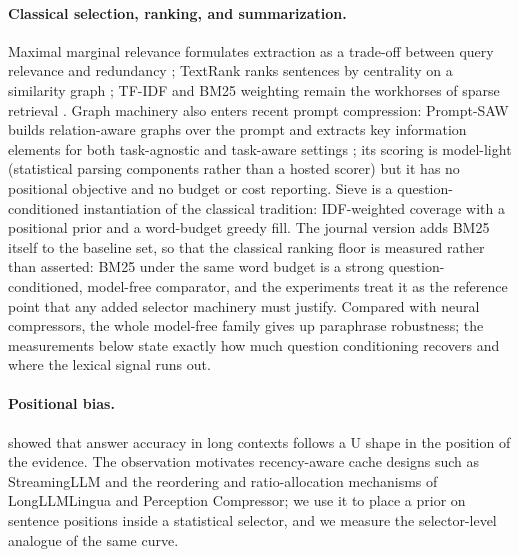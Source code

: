 \documentclass[pdflatex,sn-basic]{sn-jnl}
\theoremstyle{remark}
\newcommand{\method}{Sieve}
\begin{document}
\paragraph{Classical selection, ranking, and summarization.}
Maximal marginal relevance formulates extraction as a trade-off
between query relevance and redundancy \citep{carbonell1998mmr};
TextRank ranks sentences by centrality on a similarity graph
\citep{mihalcea2004textrank}; TF-IDF and BM25 weighting remain the
workhorses of sparse retrieval \citep{robertson2009bm25}. Graph
machinery also enters recent prompt compression: Prompt-SAW builds
relation-aware graphs over the prompt and extracts key information
elements for both task-agnostic and task-aware settings
\citep{ali2024promptsaw}; its scoring is model-light (statistical
parsing components rather than a hosted scorer) but it has no
positional objective and no budget or cost reporting. \method{} is a
question-conditioned instantiation of the classical tradition:
IDF-weighted coverage with a positional prior and a word-budget greedy
fill. The journal version adds BM25 itself to the baseline set, so that
the classical ranking floor is measured rather than asserted: BM25 under
the same word budget is a strong question-conditioned,
model-free comparator, and the experiments treat it as the reference
point that any added selector machinery must justify. Compared with
neural compressors, the whole model-free family gives up paraphrase
robustness; the measurements below state exactly how much question
conditioning recovers and where the lexical signal runs out.

\paragraph{Positional bias.}
\citet{liu2023lost} showed that answer accuracy in long contexts
follows a U shape in the position of the evidence. The observation
motivates recency-aware cache designs such as StreamingLLM
\citep{xiao2023streaming} and the reordering and ratio-allocation
mechanisms of LongLLMLingua and Perception Compressor; we use it to
place a prior on sentence positions inside a statistical selector, and
we measure the selector-level analogue of the same curve.
\end{document}
